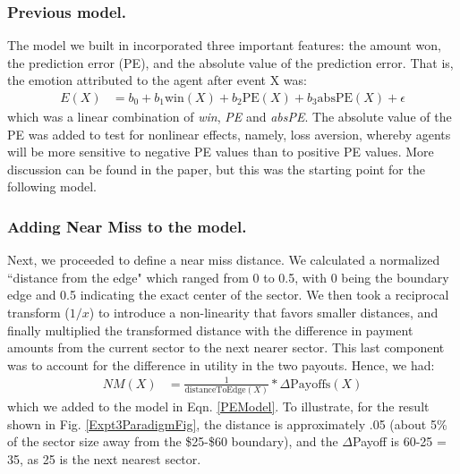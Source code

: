 \documentclass[10pt,letterpaper]{article}
\begin{document}
\subsubsection{Previous model.} The model we built in  incorporated three important features: the amount won, the prediction error (PE), and the absolute value of the prediction error. That is, the emotion attributed to the agent after event X was:
\begin{align}
E(X) &= b_0 + b_1 \text{win}(X) + b_2 \text{PE}(X) + b_3 \text{absPE}(X) + \epsilon \label{PEModel}
\end{align}
which was a linear combination of \textit{win}, \textit{PE} and \textit{absPE}. The absolute value of the PE was added to test for nonlinear effects, namely, loss aversion, whereby agents will be more sensitive to negative PE values than to positive PE values. More discussion can be found in the paper, but this was the starting point for the following model.


\subsubsection{Adding Near Miss to the model.}


Next, we proceeded to define a near miss distance. We calculated a normalized ``distance from the edge" which ranged from 0 to 0.5, with 0 being the boundary edge and 0.5 indicating the exact center of the sector. We then took a reciprocal transform ($1/x$) to introduce a non-linearity that favors smaller distances, and finally multiplied the transformed distance with the difference in payment amounts from the current sector to the next nearer sector. This last component was to account for the difference in utility in the two payouts. Hence, we had:
\begin{align}
NM(X) &= \frac{1}{\text{distanceToEdge}(X)} * \Delta\text{Payoffs}(X) \label{NMRegressor}
\end{align}
which we added to the model in Eqn. \ref{PEModel}. To illustrate, for the result shown in Fig. \ref{Expt3ParadigmFig}, the distance is approximately .05 (about 5\% of the sector size away from the \$25-\$60 boundary), and the $\Delta$Payoff is 60-25 = 35, as 25 is the next nearest sector.
\end{document}
